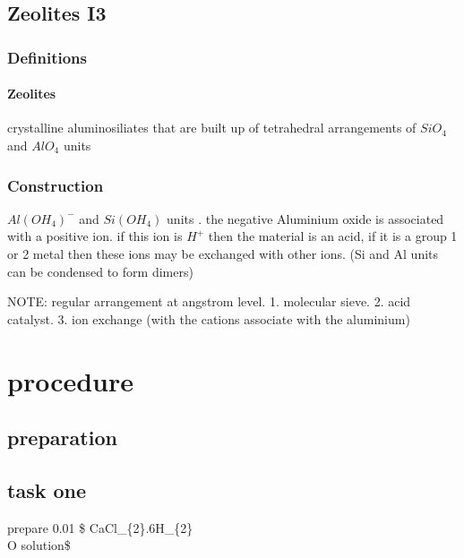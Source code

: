 \documentclass[]{article}
\date{}
\let\oldparagraph\paragraph
\renewcommand{\paragraph}[1]{\oldparagraph{#1}\mbox{}}
\begin{document}
\hypertarget{zeolites-i3}{%
\subsection{Zeolites I3}\label{zeolites-i3}}

\hypertarget{definitions}{%
\subsubsection{Definitions}\label{definitions}}

\hypertarget{zeolites}{%
\paragraph{Zeolites}\label{zeolites}}

crystalline aluminosiliates that are built up of tetrahedral
arrangements of \(SiO_4\) and \(AlO_4\) units

\hypertarget{construction}{%
\subsubsection{Construction}\label{construction}}

\(Al(OH_4)^-\) and \(Si(OH_4)\) units . the negative Aluminium oxide is
associated with a positive ion. if this ion is \(H^{+}\) then the
material is an acid, if it is a group 1 or 2 metal then these ions may
be exchanged with other ions. (Si and Al units can be condensed to form
dimers)

NOTE: regular arrangement at angstrom level. 1. molecular sieve. 2. acid
catalyst. 3. ion exchange (with the cations associate with the
aluminium)

\hypertarget{procedure}{%
\section{procedure}\label{procedure}}

\hypertarget{preparation}{%
\subsection{preparation}\label{preparation}}

\hypertarget{task-one}{%
\subsection{task one}\label{task-one}}

prepare 0.01 \$ CaCl\_\{2\}.6H\_\{2\}\\
O solution\$
\end{document}
